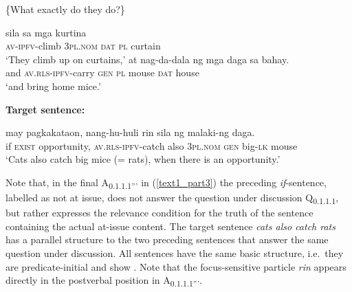 \documentclass[output=paper,
,modfonts
,nonflat]{langsci/langscibook}
\begin{document}
\begin{exe}
\ex\label{text1_part2}
\begin{xlist}
 \{What exactly do they do?\}
\end{xlist}
\begin{xlist}[{>}>{>}> A\textsubscript{{0.1.1.1'''}}:]
 {{\ob}sila{\cb}\topic} {{\ob}sa} mga {kurtina{\cb}\focus{\cb}\sq}\\
\textsc{\void{[[}av-ipfv}-climb \textsc{\void{[}3pl.nom} \textsc{\void{[}dat} \textsc{pl} curtain\\
\glt `They climb up on curtains,'
\gll at    {{\ob}{\ob}nag-da-dala}    ng mga daga    sa {bahay{\cb}\focus{\cb}\sq}.\\
 and \textsc{\void{[[}av.rls-ipfv}-carry \textsc{gen} \textsc{pl} mouse   \textsc{dat} house\\
\glt `and bring home mice.'
\end{xlist}
\end{exe}
\begin{exe}
\ex\label{text1_part3}\textbf{Target sentence:}
\begin{xlist}[{>}>{>}> A\textsubscript{{0.1.1.1''':}}]
 may {pagkakataon,{\cb}\nai} {{\ob}{\ob}nang-hu-huli{\cb}\focus} rin {{\ob}sila{\cb}\topic} {{\ob}ng} {malaki-ng} {daga{\cb}\focus{\cb}\sq}.\\
{\void{[}if} \textsc{exist} opportunity, \textsc{\void{[[}av.rls-ipfv}-catch also \textsc{\void{[}3pl.nom} \textsc{\void{[}gen} big-\textsc{lk} mouse\\
\glt `Cats also catch big mice (= rats), when there is an opportunity.' 
\end{xlist}
\end{exe}

\noindent Note that, in the final  A\textsubscript{{0.1.1.1'''}} in (\ref{text1_part3}) the preceding \textit{if}-sentence, labelled as not at issue, does not answer the question under discussion Q\textsubscript{{0.1.1.1}}, but rather expresses the relevance condition for the truth of the sentence containing the actual at-issue content. The target sentence \textit{cats also catch rats} has a parallel structure to the two preceding sentences that answer the same question under discussion. All sentences have the same basic structure, i.e.\ they are predicate-initial and show . Note that the focus-sensitive particle \textit{rin} appears directly in the postverbal position in A\textsubscript{{0.1.1.1'''}}. 
\end{document}
